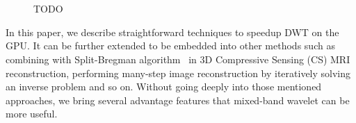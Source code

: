 \begin{figure}[t]
	\centering  
		\\
			\\
\caption{TODO}
\label{fig:barbara_tradition}
\end{figure}



In this paper, we describe straightforward techniques to speedup DWT on the GPU. 
It can be further extended to be embedded into other methods such as combining with Split-Bregman algorithm~\cite{goldstein_split_2009} in 3D Compressive Sensing (CS) MRI  reconstruction, performing many-step image reconstruction by iteratively solving an inverse problem and so on. 
Without going deeply into those mentioned approaches, we bring several advantage features that mixed-band wavelet can be more useful.

